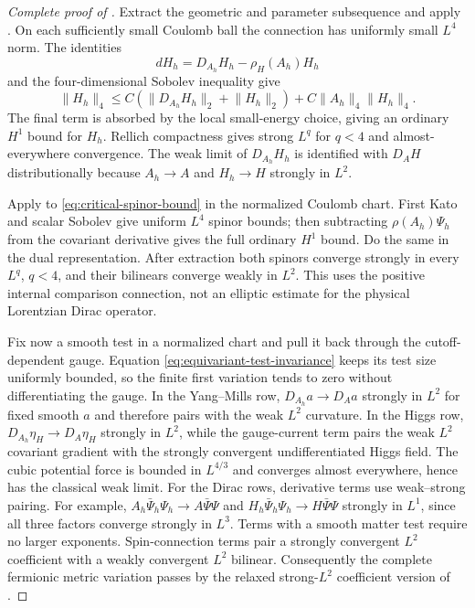\documentclass[11pt]{article}
\numberwithin{equation}{section}
\theoremstyle{definition}
\theoremstyle{remark}
\newcommand{\norm}[1]{\lVert#1\rVert}
\begin{document}
\begin{proof}[Complete proof of ]
Extract the geometric and parameter subsequence and apply
.  On each sufficiently small Coulomb ball the
connection has uniformly small $L^4$ norm.  The identities
\[
 dH_h=D_{A_h}H_h-\rho_H(A_h)H_h
\]
and the four-dimensional Sobolev inequality give
\[
 \norm{H_h}_4
 \le C(\norm{D_{A_h}H_h}_2+\norm{H_h}_2)
   +C\norm{A_h}_4\norm{H_h}_4.
\]
The final term is absorbed by the local small-energy choice, giving an
ordinary $H^1$ bound for $H_h$.  Rellich compactness gives strong $L^q$ for
$q<4$ and almost-everywhere convergence.  The weak limit of $D_{A_h}H_h$ is
identified with $D_AH$ distributionally because $A_h\to A$ and
$H_h\to H$ strongly in $L^2$.

Apply  to
\eqref{eq:critical-spinor-bound} in the normalized Coulomb chart. First Kato
and scalar Sobolev give uniform $L^4$ spinor bounds; then subtracting
$\rho(A_h)\Psi_h$ from the covariant derivative gives the full ordinary
$H^1$ bound. Do the same in the dual representation. After extraction both
spinors converge strongly in every $L^q$, $q<4$, and their bilinears converge
weakly in $L^2$. This uses the positive internal comparison connection, not
an elliptic estimate for the physical Lorentzian Dirac operator.

Fix now a smooth test in a normalized chart and pull it back through the
cutoff-dependent gauge.  Equation \eqref{eq:equivariant-test-invariance}
keeps its test size uniformly bounded, so the finite first variation tends to
zero without differentiating the gauge.  In the Yang--Mills row,
$D_{A_h}a\to D_Aa$ strongly in $L^2$ for fixed smooth $a$ and therefore pairs
with the weak $L^2$ curvature.  In the Higgs row,
$D_{A_h}\eta_H\to D_A\eta_H$ strongly in $L^2$, while the gauge-current term
pairs the weak $L^2$ covariant gradient with the strongly convergent
undifferentiated Higgs field.  The cubic potential force is bounded in
$L^{4/3}$ and converges almost everywhere, hence has the classical weak limit.
For the Dirac rows, derivative terms use weak--strong pairing. For example,
$A_h\bar\Psi_h\Psi_h\to A\bar\Psi\Psi$ and
$H_h\bar\Psi_h\Psi_h\to H\bar\Psi\Psi$ strongly in $L^1$, since all three
factors converge strongly in $L^3$. Terms with a smooth matter test require
no larger exponents. Spin-connection terms pair a strongly convergent $L^2$
coefficient with a weakly convergent $L^2$ bilinear. Consequently the complete
fermionic metric variation passes by the relaxed strong-$L^2$ coefficient
version of .


\end{proof}
\end{document}
